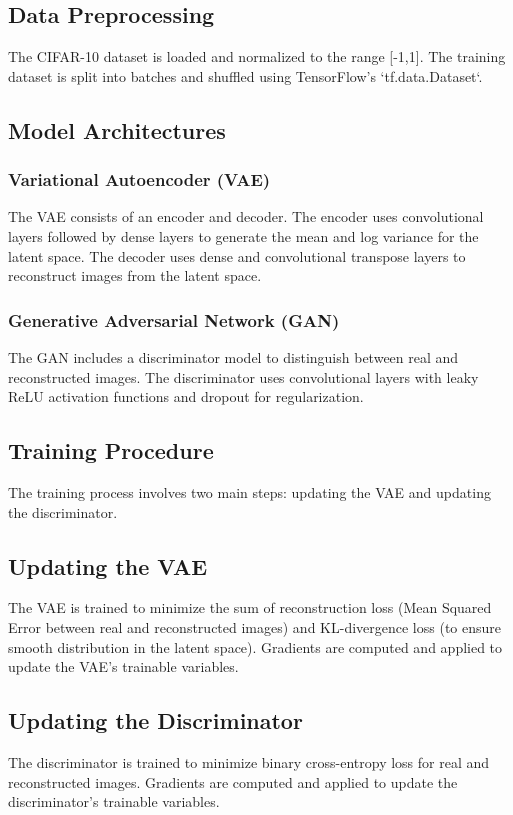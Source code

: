 \documentclass{article}
\begin{document}
\subsection{Data Preprocessing}
The CIFAR-10 dataset is loaded and normalized to the range [-1,1]. The training dataset is split into batches and shuffled using TensorFlow's `tf.data.Dataset`.

\subsection{Model Architectures}

\subsubsection{Variational Autoencoder (VAE)}
The VAE consists of an encoder and decoder. The encoder uses convolutional layers followed by dense layers to generate the mean and log variance for the latent space. The decoder uses dense and convolutional transpose layers to reconstruct images from the latent space.

\subsubsection{Generative Adversarial Network (GAN)}
The GAN includes a discriminator model to distinguish between real and reconstructed images. The discriminator uses convolutional layers with leaky ReLU activation functions and dropout for regularization.

\subsection{Training Procedure}
The training process involves two main steps: updating the VAE and updating the discriminator.

\subsection{Updating the VAE}
The VAE is trained to minimize the sum of reconstruction loss (Mean Squared Error between real and reconstructed images) and KL-divergence loss (to ensure smooth distribution in the latent space). Gradients are computed and applied to update the VAE's trainable variables.

\subsection{Updating the Discriminator}
The discriminator is trained to minimize binary cross-entropy loss for real and reconstructed images. Gradients are computed and applied to update the discriminator's trainable variables.
\end{document}
